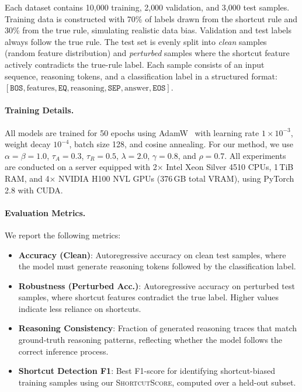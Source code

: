 Each dataset contains 10{,}000 training, 2{,}000 validation, and 3{,}000 test samples. Training data is constructed with 70\% of labels drawn from the shortcut rule and 30\% from the true rule, simulating realistic data bias. Validation and test labels always follow the true rule. The test set is evenly split into \emph{clean} samples (random feature distribution) and \emph{perturbed} samples where the shortcut feature actively contradicts the true-rule label. Each sample consists of an input sequence, reasoning tokens, and a classification label in a structured format: $[\texttt{BOS}, \text{features}, \texttt{EQ}, \text{reasoning}, \texttt{SEP}, \text{answer}, \texttt{EOS}]$.

\paragraph{Training Details.}
All models are trained for 50 epochs using AdamW~\citep{loshchilov2019decoupled} with learning rate $1 \times 10^{-3}$, weight decay $10^{-4}$, batch size 128, and cosine annealing. For our method, we use $\alpha = \beta = 1.0$, $\tau_A = 0.3$, $\tau_R = 0.5$, $\lambda = 2.0$, $\gamma = 0.8$, and $\rho = 0.7$. All experiments are conducted on a server equipped with 2$\times$ Intel Xeon Silver 4510 CPUs, 1\,TiB RAM, and 4$\times$ NVIDIA H100 NVL GPUs (376\,GB total VRAM), using PyTorch 2.8 with CUDA.

\paragraph{Evaluation Metrics.}
We report the following metrics:
\begin{itemize}[leftmargin=*, itemsep=2pt]
    \item \textbf{Accuracy (Clean)}: Autoregressive accuracy on clean test samples, where the model must generate reasoning tokens followed by the classification label.
    \item \textbf{Robustness (Perturbed Acc.)}: Autoregressive accuracy on perturbed test samples, where shortcut features contradict the true label. Higher values indicate less reliance on shortcuts.
    \item \textbf{Reasoning Consistency}: Fraction of generated reasoning traces that match ground-truth reasoning patterns, reflecting whether the model follows the correct inference process.
    \item \textbf{Shortcut Detection F1}: Best F1-score for identifying shortcut-biased training samples using our \textsc{ShortcutScore}, computed over a held-out subset.
\end{itemize}

